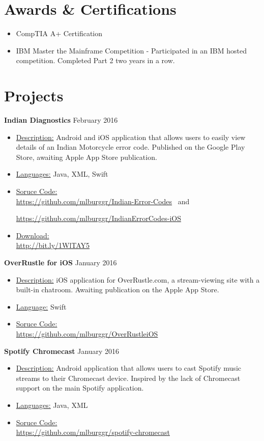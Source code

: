 \documentclass[margin]{res}
\begin{document}
\begin{resume}
 
\section{Awards \& Certifications}
\begin{itemize}
\item CompTIA A+ Certification
\item IBM Master the Mainframe Competition - Participated in an IBM hosted competition. Completed Part 2 two years in a row.
\end{itemize}

\section{Projects}
{\bf Indian Diagnostics} \hfill February 2016
\begin{itemize}   
 \item \underline{Description:} Android and iOS application that allows users to easily view details of an Indian Motorcycle error code. Published on the Google Play Store, awaiting Apple App Store publication.\
 \item \underline{Languages:} Java, XML, Swift\
 \item \underline{Soruce Code:} \\ \url{https://github.com/mlburggr/Indian-Error-Codes}      \ 
 and 

  \url{https://github.com/mlburggr/IndianErrorCodes-iOS}\
  
 \item \underline{Download:} \\ \url{http://bit.ly/1WlTAY5}
\end{itemize}

{\bf OverRustle for iOS} \hfill January 2016
\begin{itemize}
 \item \underline{Description:} iOS application for OverRustle.com, a stream-viewing site with a built-in chatroom. Awaiting publication on the Apple App Store.\
 \item \underline{Language:} Swift
 \item \underline{Soruce Code:} \\
 \url{https://github.com/mlburggr/OverRustleiOS}\
\end{itemize}

{\bf Spotify Chromecast} \hfill January 2016
\begin{itemize}
 \item \underline{Description:} Android application that allows users to cast Spotify music streams to their Chromecast device. Inspired by the lack of Chromecast support on the main Spotify application.\
 \item \underline{Languages:} Java, XML
 \item \underline{Soruce Code:} \\
 \url{https://github.com/mlburggr/spotify-chromecast}\
\end{itemize}


\end{resume}
\end{document}
